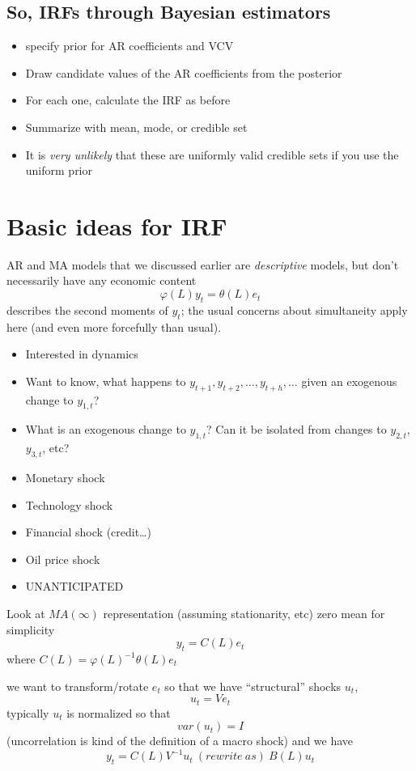 \subsection{So, IRFs through Bayesian estimators}

\begin{itemize}
\item specify prior for AR coefficients and VCV
\item Draw candidate values of the AR coefficients from the posterior
\item For each one, calculate the IRF as before
\item Summarize with mean, mode, or credible set
\item It is \emph{very unlikely} that these are uniformly valid
  credible sets if you use the uniform prior
\end{itemize}

\section{Basic ideas for IRF}

AR and MA models that we discussed earlier are \emph{descriptive}
models, but don't necessarily have any economic content
\[φ(L) y_t = θ(L) e_t\]
describes the second moments of $y_t$; the usual concerns about
simultaneity apply here (and even more forcefully than usual).

\begin{itemize}
\item Interested in dynamics
\item Want to know, what happens to $y_{t+1}, y_{t+2},…, y_{t+h},…$
  given an exogenous change to $y_{1,t}$?
\item What is an exogenous change to $y_{1,t}$? Can it be isolated
  from changes to $y_{2,t}$, $y_{3,t}$, etc?
\item Monetary shock
\item Technology shock
\item Financial shock (credit…)
\item Oil price shock
\item UNANTICIPATED
\end{itemize}

Look at $MA(∞)$ representation (assuming stationarity, etc) zero mean
for simplicity \[y_t = C(L) e_t\] where $C(L) = φ(L)^{-1} θ(L) e_t$

we want to transform/rotate $e_t$ so that we have ``structural''
shocks $u_t$,
\[u_t = V e_t\] typically $u_t$ is normalized so that
\[var( u_t ) = I\] (uncorrelation is kind of the definition of a macro
shock) and we have
\[y_t = C(L) V^{-1} u_t\ (rewrite\ as)\ B(L) u_t\]

